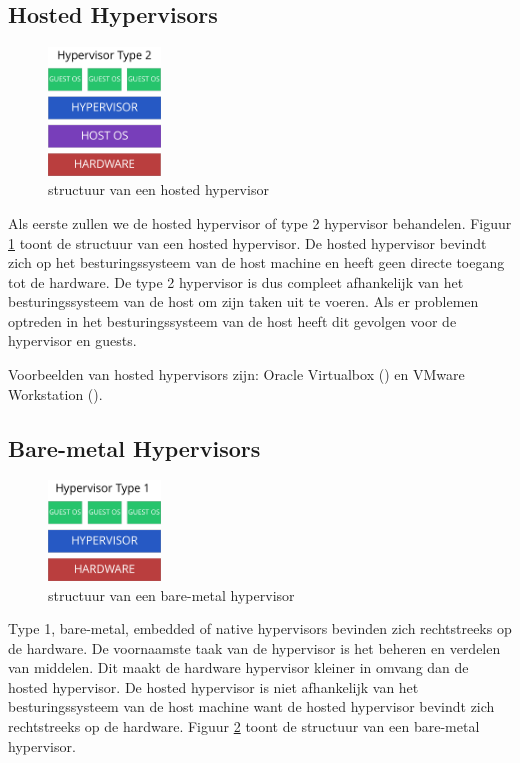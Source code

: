 \newpage

\subsection{Hosted Hypervisors}

\begin{figure}
    \centering
    \includegraphics[width=3cm]{img/hypervisor-2}
    \caption{structuur van een hosted hypervisor}
    \label{fig:hypervisor-2}
\end{figure}

Als eerste zullen we de hosted hypervisor of type 2 hypervisor behandelen. Figuur \ref{fig:hypervisor-2} toont de structuur van een hosted hypervisor. De hosted hypervisor bevindt zich op het besturingssysteem van de host machine en heeft geen directe toegang tot de hardware. De type 2 hypervisor is dus compleet afhankelijk van het besturingssysteem van de host om zijn taken uit te voeren. Als er problemen optreden in het besturingssysteem van de host heeft dit gevolgen voor de hypervisor en guests.

Voorbeelden van hosted hypervisors zijn: Oracle Virtualbox (\cite{oracle_oracle_2016}) en VMware Workstation (\cite{vmware_vmware_2016}).

\subsection{Bare-metal Hypervisors}

\begin{figure}
    \centering
    \includegraphics[width=3cm]{img/hypervisor-1}
    \caption{structuur van een bare-metal hypervisor}
    \label{fig:hypervisor-1}
\end{figure}

Type 1, bare-metal, embedded of native hypervisors bevinden zich rechtstreeks op de hardware. De voornaamste taak van de hypervisor is het beheren en verdelen van middelen. Dit maakt de hardware hypervisor kleiner in omvang dan de hosted hypervisor. De hosted hypervisor is niet afhankelijk van het besturingssysteem van de host machine want de hosted hypervisor bevindt zich rechtstreeks op de hardware. Figuur \ref{fig:hypervisor-1} toont de structuur van een bare-metal hypervisor.

